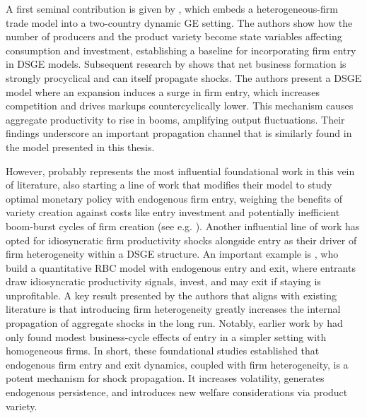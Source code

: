 \documentclass[a4paper,12pt]{article} %
\numberwithin{equation}{section} %
\numberwithin{figure}{section}
\numberwithin{table}{section}
\begin{document}
A first seminal contribution is given by \textcite{ghironi2007trade}, which embeds a heterogeneous-firm trade model into
a two-country dynamic GE setting. The authors show how the number of producers and the product variety become state variables
affecting consumption and investment, establishing a baseline for incorporating firm entry in DSGE models. 
Subsequent research by \textcite{jaimovich2008firm} shows that net business formation is strongly procyclical 
and can itself propagate shocks. The authors present a DSGE model where an expansion induces a surge in firm entry, 
which increases competition and drives markups countercyclically lower. This mechanism causes aggregate productivity to 
rise in booms, amplifying output fluctuations. Their findings underscore an important propagation channel 
that is similarly found in the model presented in this thesis.

However, \textcite{bilbiie2012endogenous} probably represents the most influential foundational work in this vein of literature, 
also starting a line of work that modifies their model to study optimal monetary policy with endogenous firm entry, weighing the benefits 
of variety creation against costs like entry investment and potentially inefficient boom-burst cycles of firm creation (see e.g. \cite{bilbiie2014optimal, lewis2012firm}).
Another influential line of work has opted for idiosyncratic firm productivity shocks alongside entry as their driver of firm heterogeneity within a DSGE structure. 
An important example is \textcite{clementi2016entry}, who build a quantitative RBC model with endogenous entry and exit, where entrants draw idiosyncratic 
productivity signals, invest, and may exit if staying is unprofitable. A key result presented by the authors that aligns with existing literature is that introducing 
firm heterogeneity greatly increases the internal propagation of aggregate shocks in the long run. Notably, earlier work by \textcite{samaniego2008entry} had 
only found modest business-cycle effects of entry in a simpler setting with homogeneous firms. In short, these foundational studies established that 
endogenous firm entry and exit dynamics, coupled with firm heterogeneity, is a potent mechanism for shock propagation. It increases volatility, 
generates endogenous persistence, and introduces new welfare considerations via product variety.
\end{document}
